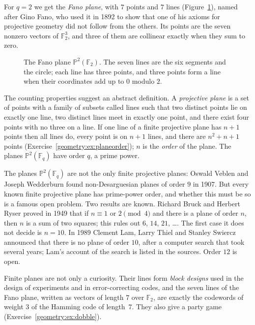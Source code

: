 For $q=2$ we get the \emph{Fano plane}, with $7$ points and $7$ lines (Figure~\ref{geometry:fig:fano}), named after Gino Fano, who used it in 1892 to show
that one of his axioms for projective geometry did not follow from the others. Its points are the seven nonzero vectors of $\mathbb F_2^3$, and
three of them are collinear exactly when they sum to zero.

\begin{figure}[ht]
\centering
{}
\caption{The Fano plane $\mathbb P^2(\mathbb F_2)$. The seven lines are the six segments and the circle; each line has three points, and three
points form a line when their coordinates add up to $0$ modulo $2$.}
\label{geometry:fig:fano}
\end{figure}

The counting properties suggest an abstract definition. A \emph{projective plane} is a set of points with a family of subsets called lines such
that two distinct points lie on exactly one line, two distinct lines meet in exactly one point, and there exist four points with no three on a
line. If one line of a finite projective plane has $n+1$ points then all lines do, every point is on $n+1$ lines, and there are $n^2+n+1$ points
(Exercise~\ref{geometry:ex:planeorder}); $n$ is the \emph{order} of the plane. The planes $\mathbb P^2(\mathbb F_q)$ have order $q$, a prime power.

\begin{remark}
The planes $\mathbb P^2(\mathbb F_q)$ are not the only finite projective planes: Oswald Veblen and Joseph Wedderburn found non-Desarguesian
planes of order $9$ in 1907. But every known finite projective plane has prime-power order, and whether this must be so is a famous open
problem. Two results are known. Richard Bruck and Herbert Ryser proved in 1949 that if $n\equiv1$ or $2\pmod 4$ and there is a plane of order $n$,
then $n$ is a sum of two squares; this rules out $6$, $14$, $21$, \dots. The first case it does not decide is $n=10$. In 1989 Clement Lam, Larry
Thiel and Stanley Swiercz announced that there is no plane of order $10$, after a computer search that took several years; Lam's account of the
search is listed in the sources. Order $12$ is open.
\end{remark}

Finite planes are not only a curiosity. Their lines form \emph{block designs} used in the design of experiments and in error-correcting codes,
and the seven lines of the Fano plane, written as vectors of length $7$ over $\mathbb F_2$, are exactly the codewords of weight $3$ of the
Hamming code of length~$7$. They also give a party game (Exercise~\ref{geometry:ex:dobble}).

